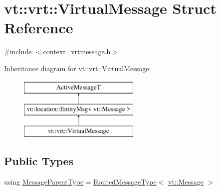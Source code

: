 \hypertarget{structvt_1_1vrt_1_1_virtual_message}{}\section{vt\+:\+:vrt\+:\+:Virtual\+Message Struct Reference}
\label{structvt_1_1vrt_1_1_virtual_message}


{\ttfamily \#include $<$context\+\_\+vrtmessage.\+h$>$}

Inheritance diagram for vt\+:\+:vrt\+:\+:Virtual\+Message\+:\begin{figure}[H]
\begin{center}
\leavevmode
\includegraphics[height=3.000000cm]{structvt_1_1vrt_1_1_virtual_message}
\end{center}
\end{figure}
\subsection*{Public Types}
\begin{DoxyCompactItemize}
\item 
using \hyperlink{structvt_1_1vrt_1_1_virtual_message_acb60e6224a32e6d0a6fce939f511737a}{Message\+Parent\+Type} = \hyperlink{namespacevt_1_1vrt_a00a8c6e49603fd62cd0a3fbd99277e36}{Routed\+Message\+Type}$<$ \hyperlink{namespacevt_a3a3ddfef40b4c90915fa43cdd5f129ea}{vt\+::\+Message} $>$
\end{DoxyCompactItemize}
